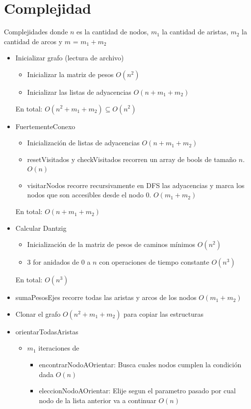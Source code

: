 \documentclass[11pt, a4paper, spanish]{article}
\begin{document}
\section{Complejidad}
Complejidades donde $n$ es la cantidad de nodos, $m_{1}$ la cantidad de aristas, $m_{2}$ la cantidad de arcos y $m$ = $m_{1} + m_{2}$ \\
\begin{itemize}
	\item Inicializar grafo (lectura de archivo)
	\begin{itemize}
		\item Inicializar la matriz de pesos $O(n^{2})$
		\item Inicializar las listas de adyacencias $O(n + m_{1} +m_{2})$
	\end{itemize}
	En total: $O(n^{2} + m_{1} +m_{2}) \subseteq O(n^{2})$
	\item FuertementeConexo
	\begin{itemize}
		\item Inicializaci\'on de listas de adyacencias $O(n + m_{1} + m_{2})$
		\item resetVisitados y checkVisitados recorren un array de bools de tama\~{n}o $n$. $O(n)$
		\item visitarNodos recorre recursivamente en DFS las adyacencias y marca los nodos que son accesibles desde el nodo $0$. $O(m_{1} + m_{2})$
	\end{itemize}
	En total: $O(n + m_{1} + m_{2})$
	\item Calcular Dantzig
	\begin{itemize}	
		\item Inicializaci\'on de la matriz de pesos de caminos m\'inimos $O(n^{2})$
		\item 3 for anidados de $0$ a $n$ con operaciones de tiempo constante $O(n^{3})$
	\end{itemize}
	En total: $O(n^{3})$
	\item sumaPesosEjes recorre todas las aristas y arcos de los nodos $O(m_{1} + m_{2})$
	\item Clonar el grafo $O(n^{2} + m_{1} + m_{2})$ para copiar las estructuras
	\item orientarTodasAristas
	\begin{itemize}
		\item $m_{1}$ iteraciones de
		\begin{itemize}
			\item encontrarNodoAOrientar: Busca cuales nodos cumplen la condici\'on dada $O(n)$
			\item eleccionNodoAOrientar: Elije segun el parametro pasado por cual nodo de la lista anterior va a continuar $O(n)$

\end{itemize}
\end{itemize}
\end{itemize}
\end{document}
